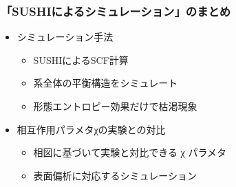 \documentclass[12pt, dvipdfmx]{beamer}
\begin{document}
\begin{frame}
	\frametitle{「SUSHIによるシミュレーション」のまとめ}
        \begin{boxnote}
            \vspace{-3mm}
            \begin{itemize}
                \item シミュレーション手法
                    \begin{itemize}
						\item SUSHIによるSCF計算
						\item 系全体の平衡構造をシミュレート
                        \item 形態エントロピー効果だけで枯渇現象
                    \end{itemize} 
                \item 相互作用パラメタχの実験との対比
                    \begin{itemize}
                        \item 相図に基づいて実験と対比できる χ パラメタ
                        \item 表面偏析に対応するシミュレーション
                    \end{itemize} 
            \end{itemize}
        \end{boxnote}
\end{frame}
\end{document}
